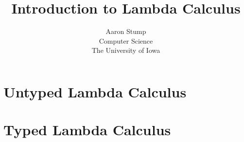 \documentclass{book}[12pt]
\begin{document}
\title{Introduction to Lambda Calculus}

\author{Aaron Stump \\
Computer Science \\
The University of Iowa
}

\maketitle
\frontmatter

\tableofcontents

\mainmatter



\part{Untyped Lambda Calculus}




%

\part{Typed Lambda Calculus}







\end{document}

